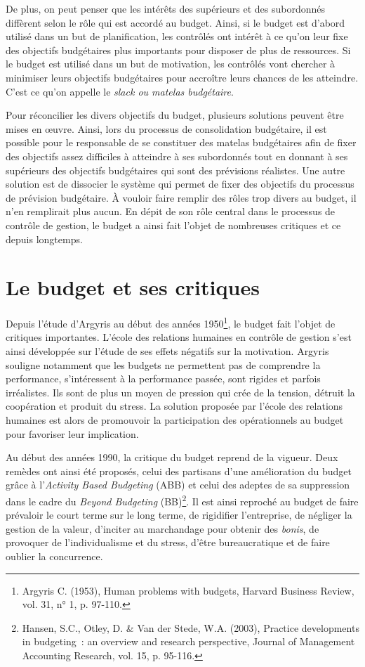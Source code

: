 \documentclass[oneside]{kaobook}
\begin{document}
De plus, on peut penser que les intérêts des supérieurs et des subordonnés diffèrent selon le rôle qui est accordé au budget. Ainsi, si le budget est d'abord utilisé dans un but de planification, les contrôlés ont intérêt à ce qu'on leur fixe des objectifs budgétaires plus importants pour disposer de plus de ressources. Si le budget est utilisé dans un but de motivation, les contrôlés vont chercher à minimiser leurs objectifs budgétaires pour accroître leurs chances de les atteindre. C'est ce qu'on appelle le \emph{slack ou matelas budgétaire}. 

Pour réconcilier les divers objectifs du budget, plusieurs solutions peuvent être mises en œuvre. Ainsi, lors du processus de consolidation budgétaire, il est possible pour le responsable de se constituer des matelas budgétaires afin de fixer des objectifs assez difficiles à atteindre à ses subordonnés tout en donnant à ses supérieurs des objectifs budgétaires qui sont des prévisions réalistes. Une autre solution est de dissocier le système qui permet de fixer des objectifs du processus de prévision budgétaire. À vouloir faire remplir des rôles trop divers au budget, il n'en remplirait plus aucun. En dépit de son rôle central dans le processus de contrôle de gestion, le budget a ainsi fait l'objet de nombreuses critiques et ce depuis longtemps.

\section{Le budget et ses critiques}
\label{sec:org851fa34}
Depuis l'étude d'Argyris au début des années 1950\footnote{Argyris C. (1953), Human problems with budgets, Harvard Business Review, vol. 31, n° 1, p. 97-110.}, le budget fait l'objet de critiques importantes. L'école des relations humaines en contrôle de gestion s'est ainsi développée sur l'étude de ses effets négatifs sur la motivation. Argyris souligne notamment que les budgets ne permettent pas de comprendre la performance, s'intéressent à la performance passée, sont rigides et parfois irréalistes. Ils sont de plus un moyen de pression qui crée de la tension, détruit la coopération et produit du stress. La solution proposée par l'école des relations humaines est alors de promouvoir la participation des opérationnels au budget pour favoriser leur implication.

Au début des années 1990, la critique du budget reprend de la vigueur. Deux remèdes ont ainsi été proposés, celui des partisans d'une amélioration du budget grâce à l'\emph{Activity Based Budgeting} (ABB) et celui des adeptes de sa suppression dans le cadre du \emph{Beyond Budgeting} (BB)\footnote{Hansen, S.C., Otley, D. \& Van der Stede, W.A. (2003), Practice developments in budgeting : an overview and research perspective, Journal of Management Accounting Research, vol. 15, p. 95-116.}. Il est ainsi reproché au budget de faire prévaloir le court terme sur le long terme, de rigidifier l'entreprise, de négliger la gestion de la valeur, d'inciter au marchandage pour obtenir des \emph{bonis}, de provoquer de l'individualisme et du stress, d'être bureaucratique et de faire oublier la concurrence.
\end{document}

